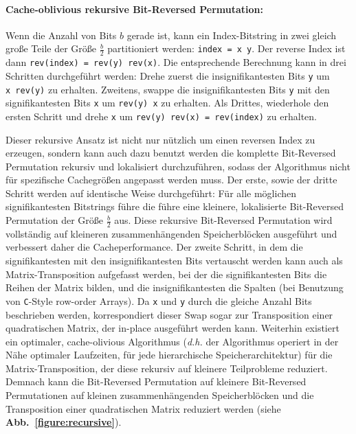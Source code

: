 \documentclass[10pt]{article}
\begin{document}
\paragraph{Cache-oblivious rekursive Bit-Reversed Permutation:}
Wenn die Anzahl von Bits $b$ gerade ist, kann ein Index-Bitstring in zwei 
gleich große Teile der Größe $\frac{b}{2}$ partitioniert werden:
{\tt index = x~y}. Der reverse Index ist dann {\tt rev(index)~=~rev(y)~rev(x)}.
Die entsprechende Berechnung kann in drei Schritten durchgeführt werden:
Drehe zuerst die insignifikantesten Bits {\tt y} um {\tt x~rev(y)} zu erhalten. 
Zweitens, swappe die insignifikantesten Bits {\tt y} mit den signifikantesten Bits
{\tt x} um {\tt rev(y)~x} zu erhalten. Als Drittes, wiederhole den ersten Schritt und drehe 
{\tt x} um {\tt rev(y)~rev(x)~=~rev(index)} zu erhalten.

Dieser rekursive Ansatz ist nicht nur nützlich um einen reversen Index 
zu erzeugen, sondern kann auch dazu benutzt werden die komplette 
Bit-Reversed Permutation rekursiv und lokalisiert durchzuführen, 
sodass der Algorithmus nicht für spezifische Cachegrößen angepasst werden 
muss. Der erste, sowie der dritte Schritt werden auf identische Weise 
durchgeführt: Für alle möglichen signifikantesten Bitstrings führe die
führe eine kleinere, lokalisierte Bit-Reversed Permutation der Größe
$\frac{b}{2}$ aus. Diese rekursive Bit-Reversed Permutation wird vollständig
auf kleineren zusammenhängenden Speicherblöcken ausgeführt und verbessert daher 
die Cacheperformance. Der zweite Schritt, in dem die signifikantesten mit den insignifikantesten
Bits vertauscht werden kann auch als Matrix-Transposition aufgefasst werden, bei der die 
signifikantesten Bits die Reihen der Matrix bilden, und die insignifikantesten die Spalten 
(bei Benutzung von {\tt C}-Style row-order Arrays). Da {\tt x} und {\tt y} durch die gleiche 
Anzahl Bits beschrieben werden, korrespondiert dieser Swap sogar zur Transposition einer quadratischen Matrix,
der in-place ausgeführt werden kann. Weiterhin existiert ein optimaler, cache-olivious Algorithmus
(\emph{d.h.} der Algorithmus operiert in der Nähe optimaler Laufzeiten, 
für jede hierarchische Speicherarchitektur) für die Matrix-Transposition, der diese rekursiv auf kleinere 
Teilprobleme reduziert\cite{prokop:cache}. 
Demnach kann die Bit-Reversed Permutation auf kleinere Bit-Reversed Permutationen auf kleinen 
zusammenhängenden Speicherblöcken und die Transposition einer quadratischen Matrix 
reduziert werden (siehe {\bf Abb.~\ref{figure:recursive}}).
\end{document}
